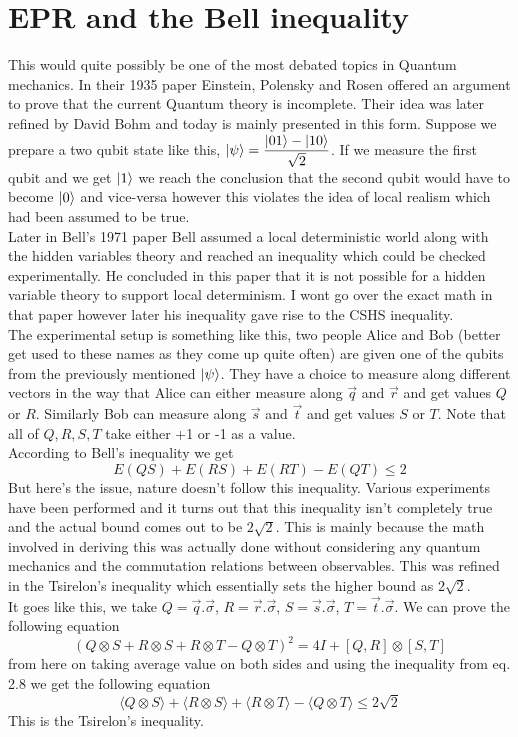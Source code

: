 \documentclass{report}
\begin{document}
\section{EPR and the Bell inequality}
This would quite possibly be one of the most debated topics in Quantum mechanics. In their 1935 paper Einstein, Polensky and Rosen offered an argument to prove that the current Quantum theory is incomplete. 
Their idea was later refined by David Bohm and today is mainly presented in this form. Suppose we prepare a two qubit state like this, $\ket{\psi} = \dfrac{\ket{01} - \ket{10}}{\sqrt{2}}$. If we measure the first qubit and we get $\ket{1}$ we reach the conclusion that the second qubit would have to become $\ket{0}$ and vice-versa however this violates the idea of local realism which had been assumed to be true.\\ 
Later in Bell's 1971 paper Bell assumed a local deterministic world along with the hidden variables theory and reached an inequality which could be checked experimentally. He concluded in this paper that it is not possible for a hidden variable theory to support local determinism. I wont go over the exact math in that paper however later his inequality gave rise to the CSHS inequality.\\
The experimental setup is something like this, two people Alice and Bob (better get used to these names as they come up quite often) are given one of the qubits from the previously mentioned $\ket{\psi}$. They have a choice to measure along different vectors in the way that Alice can either measure along $\vec{q}$ and $\vec{r}$ and get values $Q$ or $R$. Similarly Bob can measure along $\vec{s}$ and $\vec{t}$ and get values $S$ or $T$. Note that all of $Q,R,S,T$ take either +1 or -1 as a value.\\
According to Bell's inequality we get
$$E(QS) + E(RS) + E(RT) - E(QT) \leq 2$$
But here's the issue, nature doesn't follow this inequality. Various experiments have been performed and it turns out that this inequality isn't completely true and the actual bound comes out to be $2\sqrt{2}$. This is mainly because the math involved in deriving this was actually done without considering any quantum mechanics and the commutation relations between observables. This was refined in the Tsirelon's inequality which essentially sets the higher bound as $2\sqrt{2}$.\\
It goes like this, we take $Q = \vec{q}.\vec{\sigma}$, $R = \vec{r}.\vec{\sigma}$, $S = \vec{s}.\vec{\sigma}$, $T = \vec{t}.\vec{\sigma}$.
We can prove the following equation
\begin{equation}(Q \otimes S + R \otimes S + R \otimes T - Q \otimes T)^2 = 4I + [Q,R] \otimes [S, T]\end{equation}
from here on taking average value on both sides and using the inequality from eq. 2.8 we get the following equation
\begin{equation}\langle{Q \otimes S}\rangle + \langle{R \otimes S}\rangle + \langle{R \otimes T}\rangle - \langle{Q \otimes T}\rangle \leq 2\sqrt{2}\end{equation}
This is the Tsirelon's inequality.
\end{document}
